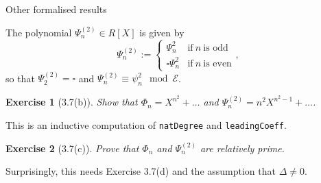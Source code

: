 \documentclass[10pt]{beamer}
\newtheorem{exercise}{Exercise}
\begin{document}
\begin{frame}[t]{Other formalised results}

The polynomial $ \Psi_n^{(2)} \in R[X] $ is given by
$$ \Psi_n^{(2)} := \begin{cases} \Psi_n^2 & \text{if} \ n \ \text{is odd} \\ \square\Psi_n^2 & \text{if} \ n \ \text{is even} \end{cases}, $$
so that $ \Psi_2^{(2)} = \square $ and $ \Psi_n^{(2)} \equiv \psi_n^2 \mod \mathcal{E} $.

\pause

\vspace{0.5cm}

\begin{exercise}[3.7(b)]
Show that $ \Phi_n = X^{n^2} + \dots $ and $ \Psi_n^{(2)} = n^2X^{n^2 - 1} + \dots $.
\end{exercise}

This is an inductive computation of \texttt{natDegree} and \texttt{leadingCoeff}.

\pause

\vspace{0.5cm}

\begin{exercise}[3.7(c)]
Prove that $ \Phi_n $ and $ \Psi_n^{(2)} $ are relatively prime.
\end{exercise}

Surprisingly, this needs Exercise 3.7(d) and the assumption that $ \Delta \ne 0 $.

\end{frame}
\end{document}
